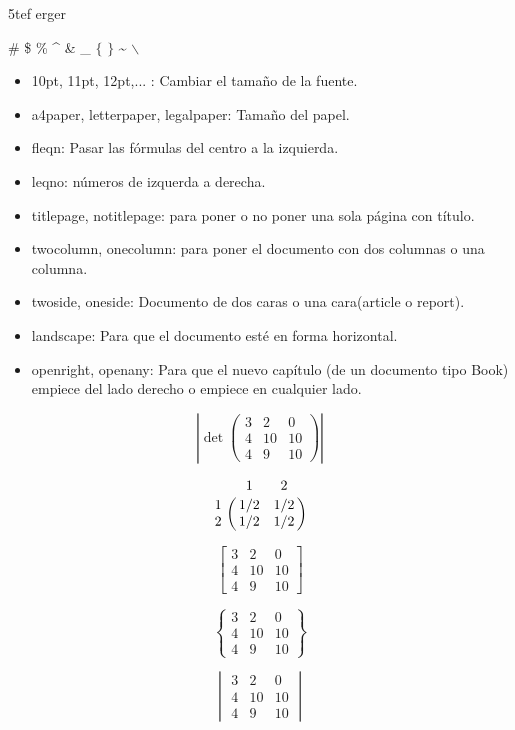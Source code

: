 \documentclass[a4paper,12pt]{article}
\begin{document}
5tef
erger

\# \$ \% \^{} \& \_ $\{$ $\}$ \~{} $\backslash$



\begin{itemize}
\item 10pt, 11pt, 12pt,... : Cambiar el tamaño de la fuente.
\item a4paper, letterpaper, legalpaper: Tamaño del papel.
\item fleqn: Pasar las fórmulas del centro a la izquierda.
\item leqno: números de izquerda a derecha.
\item titlepage, notitlepage: para poner o no poner una sola página con título.
\item twocolumn, onecolumn: para poner el documento con dos columnas o una columna.
\item twoside, oneside: Documento de dos caras o una cara(article o report).
\item landscape: Para que el documento esté en forma horizontal.
\item openright, openany: Para que el nuevo capítulo (de un documento tipo Book) empiece del lado derecho o empiece en cualquier lado.
\end{itemize}

\[\left| \det \begin{pmatrix}
3 & 2 & 0\\
4 & 10 & 10\\
4 & 9 & 10
\end{pmatrix}\right|
\]

\[\bordermatrix{ & 1 & 2 \cr 
1 & 1/2 & 1/2 \cr 
2 & 1/2 & 1/2 \cr }\]

\[\begin{bmatrix}
3 & 2 & 0\\
4 & 10 & 10\\
4 & 9 & 10
\end{bmatrix}
\]

\[\begin{Bmatrix}
3 & 2 & 0\\
4 & 10 & 10\\
4 & 9 & 10
\end{Bmatrix}
\]

\[\begin{vmatrix}
3 & 2 & 0\\
4 & 10 & 10\\
4 & 9 & 10
\end{vmatrix}
\]
\end{document}
